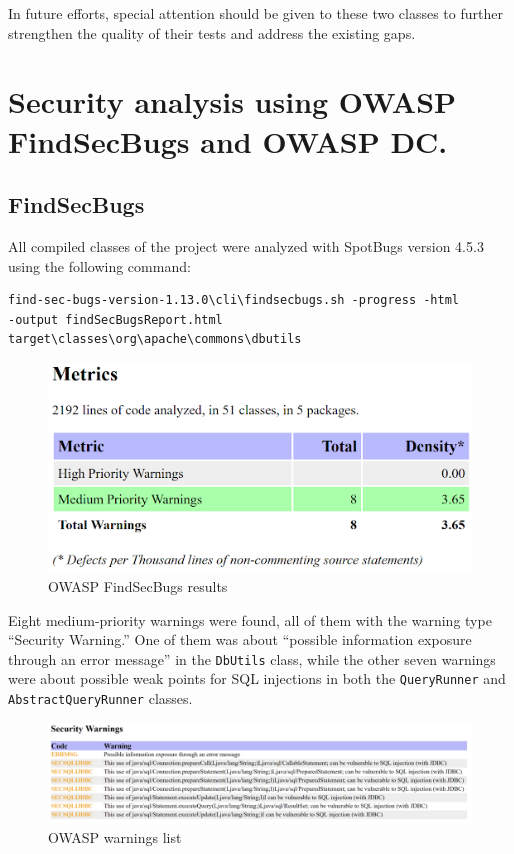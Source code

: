\documentclass[sigconf]{acmart}
\begin{document}
In future efforts, special attention should be given to these two classes to further strengthen the quality of their tests and address the existing gaps.

\section{Security analysis using OWASP FindSecBugs and OWASP DC.}

\subsection*{FindSecBugs}

All compiled classes of the project were analyzed with SpotBugs version 4.5.3 using the following command: 

\begin{lstlisting}
find-sec-bugs-version-1.13.0\cli\findsecbugs.sh -progress -html 
-output findSecBugsReport.html target\classes\org\apache\commons\dbutils
\end{lstlisting}

\begin{figure}[H]
    \centering
    \includegraphics[width=1\linewidth]{images/owasp1.png}
    \caption{OWASP FindSecBugs results}
\end{figure}

Eight medium-priority warnings were found, all of them with the warning type “Security Warning.” One of them was about “possible information exposure through an error message” in the \texttt{DbUtils} class, while the other seven warnings were about possible weak points for SQL injections in both the \texttt{QueryRunner} and \texttt{AbstractQueryRunner} classes.

\begin{figure}[H]
    \centering
    \includegraphics[width=1\linewidth]{images/owasp2.png}
    \caption{OWASP warnings list}
\end{figure}
\end{document}
